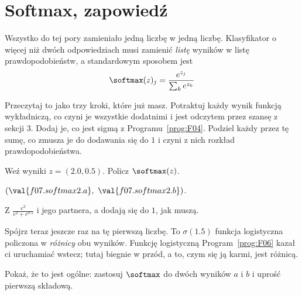 \section{Softmax, zapowiedź}
\label{sec:F07-softmax}

\begin{fr}
Wszystko do tej pory zamieniało jedną liczbę w jedną liczbę. Klasyfikator o
więcej niż dwóch odpowiedziach musi zamienić \emph{listę} wyników w listę
prawdopodobieństw, a standardowym sposobem jest
\[ \softmax(z)_j = \frac{e^{z_j}}{\sum_k e^{z_k}} \]

Przeczytaj to jako trzy kroki, które już masz. Potraktuj każdy wynik funkcją
wykładniczą, co czyni je wszystkie dodatnimi i jest odczytem przez szansę z
sekcji 3. Dodaj je, co jest sigmą z Programu~\ref{prog:F04}. Podziel każdy
przez tę sumę, co zmusza je do dodawania się do $1$ i czyni z nich rozkład
prawdopodobieństwa.

Weź wyniki $z = (\num{2.0}, \num{0.5})$. Policz $\softmax(z)$.
\nextframe
\end{fr}

\begin{fr}
\begin{ansblock}
$(\val{f07.softmax2.a},\ \val{f07.softmax2.b})$.
\end{ansblock}

Z $\frac{e^{2}}{e^{2} + e^{\num{0.5}}}$ i jego partnera, a dodają się do $1$, jak
muszą.

Spójrz teraz jeszcze raz na tę pierwszą liczbę. To $\sigma(\num{1.5})$
\dash{} funkcja logistyczna policzona w \emph{różnicy} obu wyników. Funkcję
logistyczną Program~\ref{prog:F06} kazał ci uruchamiać wstecz; tutaj biegnie
w przód, a to, czym się ją karmi, jest różnicą.

Pokaż, że to jest ogólne: zastosuj $\softmax$ do dwóch wyników $a$ i $b$ i
uprość pierwszą składową.
\nextframe
\end{fr}

